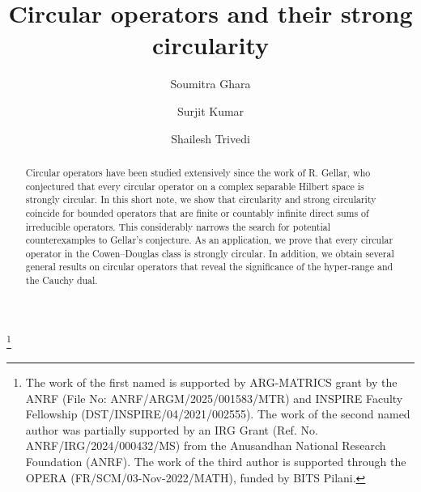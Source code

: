 \documentclass[a4paper,oneside,10pt, reqno]{amsproc}
\theoremstyle{remark}
\theoremstyle{definition}
\begin{document}
\title[Circular operators]{Circular operators and their strong circularity}
\author[S. Ghara]{Soumitra Ghara}
\author[S. Kumar]{Surjit Kumar}
\author[S. Trivedi]{Shailesh Trivedi}
\address{Department of Mathematics\\
Indian Institute of Technology  Kharagpur, Midnapore-721302, India}
\address{Department of Mathematics \\  Indian Institute of Technology Madras, Chennai  600036, India}
\address{Department of Mathematics, Birla Institute of Technology and Science, Pilani, Pilani Campus, Vidya Vihar, Pilani, Rajasthan 333031, India}

\thanks{The work of the first named  is supported by  ARG-MATRICS grant by the ANRF (File No: ANRF/ARGM/2025/001583/MTR) and INSPIRE Faculty Fellowship (DST/INSPIRE/04/2021/002555). The work of the second named author was partially supported by an IRG Grant (Ref. No. ANRF/IRG/2024/000432/MS) from the Anusandhan National Research Foundation (ANRF). The work of the third author is supported through the OPERA (FR/SCM/03-Nov-2022/MATH), funded by BITS Pilani.}

\date{}
\begin{abstract}
Circular operators have been studied extensively since the work of R. Gellar, who conjectured that every circular operator on a complex separable Hilbert space is strongly circular. In this short note, we show that circularity and strong circularity coincide for bounded operators that are finite or countably infinite direct sums of irreducible operators. This considerably narrows the search for potential counterexamples to Gellar’s conjecture. As an application, we prove that every circular operator in the Cowen–Douglas class is strongly circular. In addition, we obtain several general results on circular operators that reveal the significance of the hyper-range and the Cauchy dual.
\end{abstract}
\end{document}
